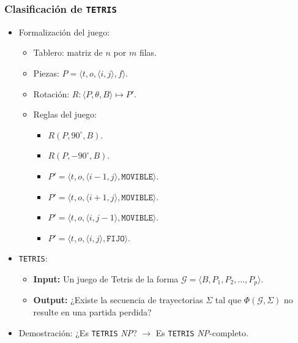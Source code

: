 \begin{frame}
\frametitle{Clasificación de \texttt{TETRIS}}
\pause
\begin{itemize}
\item Formalización del juego:
\begin{itemize}
\pause
\item Tablero: matriz de $n$ por $m$ filas.
\pause
\item Piezas: $P = \langle t, o, \langle i,j \rangle, f \rangle$.
\pause
\item Rotación: $R: \langle P, \theta, B \rangle \mapsto P'$.
\pause
\item Reglas del juego: 
\pause
\begin{itemize}
\item $R(P, 90^{\circ}, B)$.
\item $R(P, -90^{\circ}, B)$.
\item $P' = \langle t, o, \langle i - 1,j \rangle, \texttt{MOVIBLE}\rangle$.
\item $P' = \langle t, o, \langle i + 1,j \rangle, \texttt{MOVIBLE}\rangle$.
\item $P' = \langle t, o, \langle i,j - 1 \rangle, \texttt{MOVIBLE}\rangle$.
\item $P' = \langle t, o, \langle i,j \rangle, \texttt{FIJO}\rangle$.
\end{itemize}
\end{itemize}
\pause
\item \texttt{TETRIS}:
\begin{itemize}

\item \textbf{Input:} Un juego de Tetris de la forma 
$\mathcal{G} = \langle B, P_{1}, P_{2}, ..., P_{p} \rangle$.

\item \textbf{Output:} ¿Existe la secuencia de trayectorias $\Sigma$ tal que 
$\Phi(\mathcal{G}, \Sigma)$ no resulte en una partida perdida?

\end{itemize}
\pause
\item Demostración: ¿Es \texttt{TETRIS} \textsl{NP}?  {} $\longrightarrow$ Es \texttt{TETRIS} \textsl{NP}-completo.	
{\onslide}
\end{itemize}
\end{frame}
